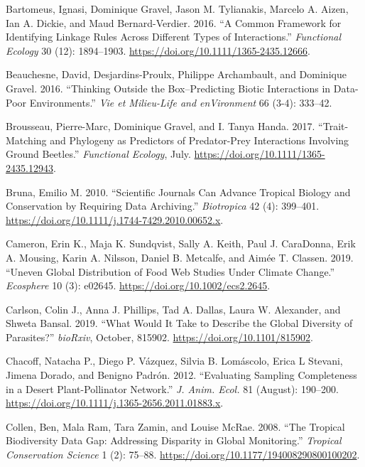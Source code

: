 \documentclass[11pt]{article}
\begin{document}
\leavevmode\hypertarget{ref-BartGrav16}{}%
Bartomeus, Ignasi, Dominique Gravel, Jason M. Tylianakis, Marcelo A.
Aizen, Ian A. Dickie, and Maud Bernard-Verdier. 2016. ``A Common
Framework for Identifying Linkage Rules Across Different Types of
Interactions.'' \emph{Functional Ecology} 30 (12): 1894--1903.
\url{https://doi.org/10.1111/1365-2435.12666}.

\leavevmode\hypertarget{ref-BeauDesj16}{}%
Beauchesne, David, Desjardins-Proulx, Philippe Archambault, and
Dominique Gravel. 2016. ``Thinking Outside the Box--Predicting Biotic
Interactions in Data-Poor Environments.'' \emph{Vie et Milieu-Life and
enVironment} 66 (3-4): 333--42.

\leavevmode\hypertarget{ref-BrouGrav17}{}%
Brousseau, Pierre-Marc, Dominique Gravel, and I. Tanya Handa. 2017.
``Trait-Matching and Phylogeny as Predictors of Predator-Prey
Interactions Involving Ground Beetles.'' \emph{Functional Ecology},
July. \url{https://doi.org/10.1111/1365-2435.12943}.

\leavevmode\hypertarget{ref-Brun10}{}%
Bruna, Emilio M. 2010. ``Scientific Journals Can Advance Tropical
Biology and Conservation by Requiring Data Archiving.''
\emph{Biotropica} 42 (4): 399--401.
\url{https://doi.org/10.1111/j.1744-7429.2010.00652.x}.

\leavevmode\hypertarget{ref-CameSund19}{}%
Cameron, Erin K., Maja K. Sundqvist, Sally A. Keith, Paul J. CaraDonna,
Erik A. Mousing, Karin A. Nilsson, Daniel B. Metcalfe, and Aimée T.
Classen. 2019. ``Uneven Global Distribution of Food Web Studies Under
Climate Change.'' \emph{Ecosphere} 10 (3): e02645.
\url{https://doi.org/10.1002/ecs2.2645}.

\leavevmode\hypertarget{ref-CarlPhil19}{}%
Carlson, Colin J., Anna J. Phillips, Tad A. Dallas, Laura W. Alexander,
and Shweta Bansal. 2019. ``What Would It Take to Describe the Global
Diversity of Parasites?'' \emph{bioRxiv}, October, 815902.
\url{https://doi.org/10.1101/815902}.

\leavevmode\hypertarget{ref-ChacVazq12}{}%
Chacoff, Natacha P., Diego P. Vázquez, Silvia B. Lomáscolo, Erica L
Stevani, Jimena Dorado, and Benigno Padrón. 2012. ``Evaluating Sampling
Completeness in a Desert Plant-Pollinator Network.'' \emph{J. Anim.
Ecol.} 81 (August): 190--200.
\url{https://doi.org/10.1111/j.1365-2656.2011.01883.x}.

\leavevmode\hypertarget{ref-CollRam08}{}%
Collen, Ben, Mala Ram, Tara Zamin, and Louise McRae. 2008. ``The
Tropical Biodiversity Data Gap: Addressing Disparity in Global
Monitoring.'' \emph{Tropical Conservation Science} 1 (2): 75--88.
\url{https://doi.org/10.1177/194008290800100202}.
\end{document}
